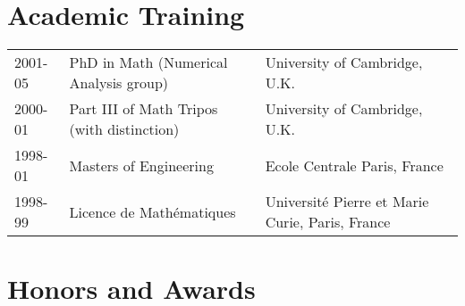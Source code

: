 \documentclass[11pt]{article}
\begin{document}


\section{Academic Training}
\begin{tabular}{lll}
2001-05 & PhD in Math (Numerical Analysis group) & University of Cambridge, U.K.\\
2000-01 & Part III of Math Tripos (with distinction) & University of Cambridge, U.K.\\
1998-01 & Masters of Engineering & Ecole Centrale Paris, France\\   
1998-99 & Licence de Math\'{e}matiques & Universit\'{e} Pierre et Marie Curie,  Paris, France\\
\end{tabular}  


\section{Honors and Awards}
\end{document}
